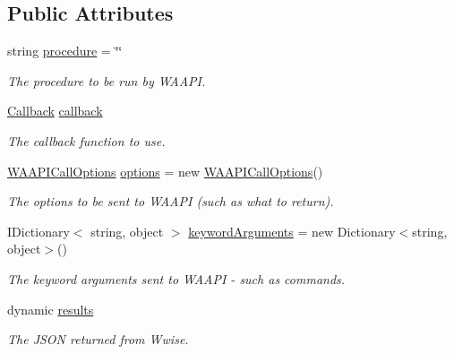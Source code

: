 \subsection*{Public Attributes}
\begin{DoxyCompactItemize}
\item 
string \mbox{\hyperlink{class_waapi_c_s_1_1_communication_1_1_packet_aff8c50917935b328e6095bb83d424bac}{procedure}} = \char`\"{}\char`\"{}
\begin{DoxyCompactList}\small\item\em The procedure to be run by W\+A\+A\+PI. \end{DoxyCompactList}\item 
\mbox{\hyperlink{class_waapi_c_s_1_1_communication_1_1_callback}{Callback}} \mbox{\hyperlink{class_waapi_c_s_1_1_communication_1_1_packet_a8e682f4225b770a862d188d41d415fc8}{callback}}
\begin{DoxyCompactList}\small\item\em The callback function to use. \end{DoxyCompactList}\item 
\mbox{\hyperlink{class_waapi_c_s_1_1_communication_1_1_w_a_a_p_i_call_options}{W\+A\+A\+P\+I\+Call\+Options}} \mbox{\hyperlink{class_waapi_c_s_1_1_communication_1_1_packet_a9f3c2b41de1dd7fecf1e2afc6e440607}{options}} = new \mbox{\hyperlink{class_waapi_c_s_1_1_communication_1_1_w_a_a_p_i_call_options}{W\+A\+A\+P\+I\+Call\+Options}}()
\begin{DoxyCompactList}\small\item\em The options to be sent to W\+A\+A\+PI (such as what to return). \end{DoxyCompactList}\item 
I\+Dictionary$<$ string, object $>$ \mbox{\hyperlink{class_waapi_c_s_1_1_communication_1_1_packet_a765d02fccc67d9be8a8fc8ed88f9407d}{keyword\+Arguments}} = new Dictionary$<$string, object$>$()
\begin{DoxyCompactList}\small\item\em The keyword arguments sent to W\+A\+A\+PI -\/ such as commands. \end{DoxyCompactList}\item 
dynamic \mbox{\hyperlink{class_waapi_c_s_1_1_communication_1_1_packet_a9dc9be78fb02e6ab862e7f27052217ff}{results}}
\begin{DoxyCompactList}\small\item\em The J\+S\+ON returned from Wwise. \end{DoxyCompactList}\end{DoxyCompactItemize}


